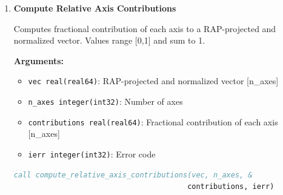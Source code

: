 \documentclass[11pt]{article}
\begin{document}
\begin{enumerate}
    \textbf{Arguments:}
    \begin{itemize}
        \item \texttt{origins real(real64)}: First set of RAP-projected vectors (e.g., centroids) [n\_dims × n\_vecs]
        \item \texttt{targets real(real64)}: Second set of RAP-projected vectors (e.g., paralogs) [n\_dims × n\_vecs]
        \item \texttt{n\_dims integer(int32)}: Dimension of each vector in RAP space
        \item \texttt{n\_vecs integer(int32)}: Number of vector pairs
        \item \texttt{vecs\_selection\_mask logical}: Mask for vector pairs where angle should be computed [n\_vecs]
        \item \texttt{n\_selected\_vecs integer(int32)}: Count of selected vector pairs
        \item \texttt{selected\_axes\_for\_signed integer(int32)}: Indices of 3 axes for directionality [3]
        \item \texttt{signed\_angles real(real64)}: Output signed angles in radians [$-\pi$,$\pi$] [n\_selected\_vecs]
        \item \texttt{ierr integer(int32)}: Error code
    \end{itemize}
\begin{lstlisting}[language=Fortran, caption={Batch Angle Calculation}]
call clock_hand_angles_for_shift_vectors(origins, targets, n_dims, &
                                        n_vecs, vecs_selection_mask, &
                                        n_selected_vecs, &
                                        selected_axes_for_signed, &
                                        signed_angles, ierr)
\end{lstlisting}

    \item \textbf{Compute Relative Axis Contributions}

    Computes fractional contribution of each axis to a RAP-projected and normalized vector. Values range [0,1] and sum to 1.
    
    \textbf{Arguments:}
    \begin{itemize}
        \item \texttt{vec real(real64)}: RAP-projected and normalized vector [n\_axes]
        \item \texttt{n\_axes integer(int32)}: Number of axes
        \item \texttt{contributions real(real64)}: Fractional contribution of each axis [n\_axes]
        \item \texttt{ierr integer(int32)}: Error code
    \end{itemize}
\begin{lstlisting}[language=Fortran, caption={Axis Contribution Analysis}]
call compute_relative_axis_contributions(vec, n_axes, &
                                        contributions, ierr)
\end{lstlisting}


\end{enumerate}
\end{document}
